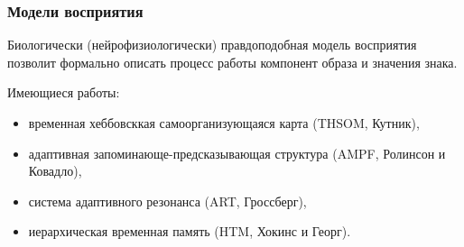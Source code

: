 \documentclass[default]{beamer}
\begin{document}
	\begin{frame}
		\frametitle{Модели восприятия}
		
		Биологически (нейрофизиологически) правдоподобная модель восприятия позволит формально описать процесс работы компонент образа и значения знака.
		\par\bigskip
		Имеющиеся работы:
		\begin{itemize}
			\item временная хеббовсккая самоорганизующаяся карта (THSOM, Кутник),
			\item адаптивная запоминающе-предсказывающая структура (AMPF, Ролинсон и Ковадло),
			\item система адаптивного резонанса (ART, Гроссберг),
			\item иерархическая временная память (HTM, Хокинс и Георг).
		\end{itemize}
	\end{frame}
\end{document}
